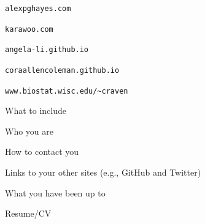 \documentclass[12pt,t,aspectratio=169]{beamer}
\begin{document}
\begin{frame}[c]{}
\addtocounter{framenumber}{-1}
  \href{https://www.alexpghayes.com}{}

\vfill \hfill {\tt \small \lolit alexpghayes.com}
\end{frame}


\begin{frame}[c]{}
\addtocounter{framenumber}{-1}
  \href{https://karawoo.com}{}

\vfill \hfill {\tt \small \lolit karawoo.com}
\end{frame}

\begin{frame}[c]{}
\addtocounter{framenumber}{-1}
  \href{https://angela-li.github.io}{}

\vfill \hfill {\tt \small \lolit angela-li.github.io}
\end{frame}


\begin{frame}[c]{}
\addtocounter{framenumber}{-1}
  \href{https://coraallencoleman.github.io}{}

\vfill \hfill {\tt \small \lolit coraallencoleman.github.io}
\end{frame}


\begin{frame}[c]{}
\addtocounter{framenumber}{-1}
  \href{https://www.biostat.wisc.edu/~craven}{}

\vfill \hfill {\tt \small \lolit www.biostat.wisc.edu/{\textasciitilde}craven}
\end{frame}


\begin{frame}[c]{What to include}

  \bbi
\item Who you are
\item How to contact you
\item Links to your other sites (e.g., GitHub and Twitter)
\item What you have been up to
\item Resume/CV
  \ei

\bigskip \bigskip


\end{frame}
\end{document}

